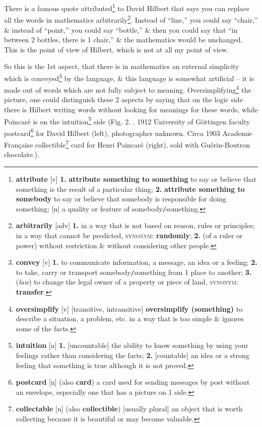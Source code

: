 \documentclass[oneside]{book}
\numberwithin{equation}{section}
\begin{document}
There is a famous quote attributed\footnote{\textbf{attribute} [v] \textbf{1.} \textbf{attribute something to something} to say or believe that something is the result of a particular thing; \textbf{2.} \textbf{attribute something to somebody} to say or believe that somebody is responsible for doing something; [n] a quality or feature of somebody\texttt{/}something.} to David Hilbert that says you can replace all the words in mathematics arbitrarily\footnote{\textbf{arbitrarily} [adv] \textbf{1.} in a way that is not based on reason, rules or principles; in a way that cannot be predicted, \textsc{synonym}: \textbf{randomly}; \textbf{2.} (of a ruler or power) without restriction \& without considering other people.}. Instead of ``line,'' you could say ``chair,'' \& instead of ``point,'' you could say ``bottle,'' \& then you could say that ``in between 2 bottles,  there is 1 chair,'' \& the mathematics would be unchanged. This is the point of view of Hilbert, which is not at all my point of view.

So this is the 1st aspect, that there is in mathematics an external simplicity which is conveyed\footnote{\textbf{convey} [v] \textbf{1.} to communicate information, a message, an idea or a feeling; \textbf{2.} to take, carry or transport somebody\texttt{/}something from 1 place to another; \textbf{3.} (\textit{law}) to change the legal owner of a property or piece of land, \textsc{synonym}: \textbf{transfer}.} by the language, \& this language is somewhat artificial -- it is made out of words which are not fully subject to meaning. Oversimplifying\footnote{\textbf{oversimplify} [v] [transitive, intransitive] \textbf{oversimplify (something)} to describe  a situation, a problem, etc. in a way that is too simple \& ignores some of the facts.} the picture, one could distinguish these 2 aspects by saying that on the logic side there is Hilbert writing words without looking for meanings for these words, while Poincar\'e is on the intuition\footnote{\textbf{intuition} [n] \textbf{1.} [uncountable] the ability to know something by using your feelings rather than considering the facts; \textbf{2.} [countable] an idea or a strong feeling that something is true although it is not proved.} side (\textsf{Fig. 2. . 1912 University of G\"ottingen faculty postcard\footnote{\textbf{postcard} [n] (also \textbf{card}) a card used for sending messages by post without an envelope, especially one that has a picture on 1 side.} for David Hilbert (left), photographer unknown. Circa 1903 Academie Fran\c{c}aise collectible\footnote{\textbf{collectable} [n] (also \textbf{collectible}) [usually plural] an object that is worth collecting because it is beautiful or may become valuable.} card for Henri Poincar\'e (right), sold with Gu\'erin-Boutron chocolate.}).
\end{document}
